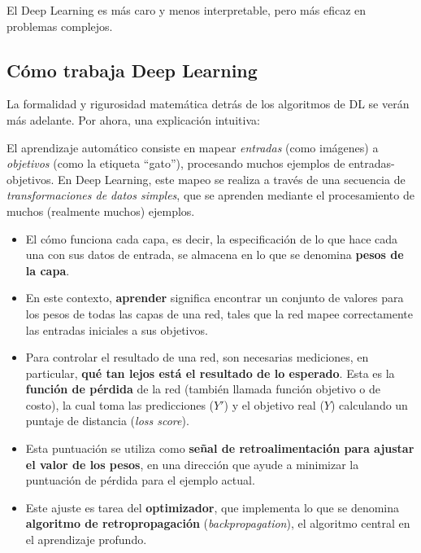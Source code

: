\begin{advertencia}
El Deep Learning es más caro y menos interpretable, pero más eficaz en problemas complejos.
\end{advertencia}

\subsection{Cómo trabaja Deep Learning}
La formalidad y rigurosidad matemática detrás de los algoritmos de DL se verán más adelante. Por ahora, una explicación intuitiva:

El aprendizaje automático consiste en mapear \emph{entradas} (como imágenes) a \emph{objetivos} (como la etiqueta ``gato''), procesando muchos ejemplos de entradas-objetivos. En Deep Learning, este mapeo se realiza a través de una secuencia de \emph{transformaciones de datos simples}, que se aprenden mediante el procesamiento de muchos (realmente muchos) ejemplos.

\begin{itemize}
    \item El cómo funciona cada capa, es decir, la especificación de lo que hace cada una con sus datos de entrada, se almacena en lo que se denomina \textbf{pesos de la capa}.
    \item En este contexto, \textbf{aprender} significa encontrar un conjunto de valores para los pesos de todas las capas de una red, tales que la red mapee correctamente las entradas iniciales a sus objetivos.
    \item Para controlar el resultado de una red, son necesarias mediciones, en particular, \textbf{qué tan lejos está el resultado de lo esperado}. Esta es la \textbf{función de pérdida} de la red (también llamada función objetivo o de costo), la cual toma las predicciones ($Y'$) y el objetivo real ($Y$) calculando un puntaje de distancia (\textit{loss score}).
    \item Esta puntuación se utiliza como \textbf{señal de retroalimentación para ajustar el valor de los pesos}, en una dirección que ayude a minimizar la puntuación de pérdida para el ejemplo actual.
    \item Este ajuste es tarea del \textbf{optimizador}, que implementa lo que se denomina \textbf{algoritmo de retropropagación} (\textit{backpropagation}), el algoritmo central en el aprendizaje profundo.
\end{itemize}

